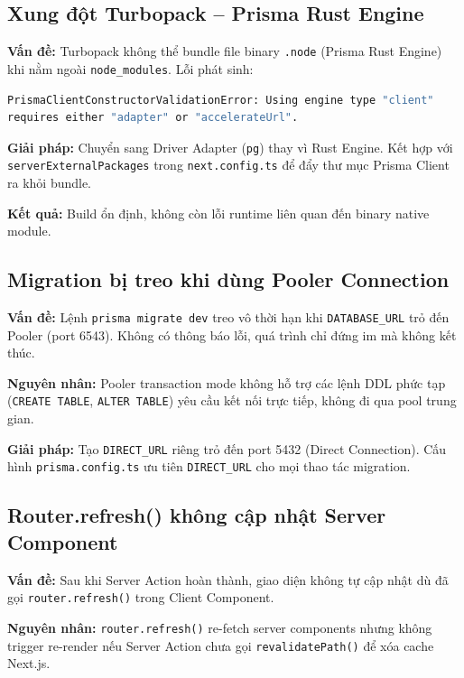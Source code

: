 \documentclass[14pt,a4paper]{report}
\begin{document}
\subsection{Xung đột Turbopack -- Prisma Rust Engine}

\textbf{Vấn đề:} Turbopack không thể bundle file binary \texttt{.node}
(Prisma Rust Engine) khi nằm ngoài \texttt{node\_modules}. Lỗi phát
sinh:

\begin{lstlisting}[language=bash]
PrismaClientConstructorValidationError: Using engine type "client"
requires either "adapter" or "accelerateUrl".
\end{lstlisting}

\textbf{Giải pháp:} Chuyển sang Driver Adapter (\texttt{pg}) thay vì
Rust Engine. Kết hợp với \texttt{serverExternalPackages} trong
\texttt{next.config.ts} để đẩy thư mục Prisma Client ra khỏi bundle.

\textbf{Kết quả:} Build ổn định, không còn lỗi runtime liên quan
đến binary native module.

\subsection{Migration bị treo khi dùng Pooler Connection}

\textbf{Vấn đề:} Lệnh \texttt{prisma migrate dev} treo vô thời hạn
khi \texttt{DATABASE\_URL} trỏ đến Pooler (port 6543). Không có
thông báo lỗi, quá trình chỉ đứng im mà không kết thúc.

\textbf{Nguyên nhân:} Pooler transaction mode không hỗ trợ các lệnh
DDL phức tạp (\texttt{CREATE TABLE}, \texttt{ALTER TABLE}) yêu cầu
kết nối trực tiếp, không đi qua pool trung gian.

\textbf{Giải pháp:} Tạo \texttt{DIRECT\_URL} riêng trỏ đến port
5432 (Direct Connection). Cấu hình \texttt{prisma.config.ts} ưu tiên
\texttt{DIRECT\_URL} cho mọi thao tác migration.

\subsection{Router.refresh() không cập nhật Server Component}

\textbf{Vấn đề:} Sau khi Server Action hoàn thành, giao diện không
tự cập nhật dù đã gọi \texttt{router.refresh()} trong Client Component.

\textbf{Nguyên nhân:} \texttt{router.refresh()} re-fetch server
components nhưng không trigger re-render nếu Server Action chưa gọi
\texttt{revalidatePath()} để xóa cache Next.js.
\end{document}
